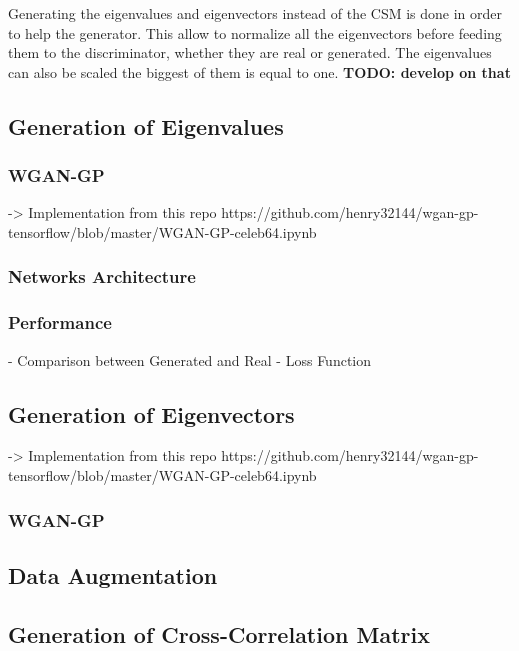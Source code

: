 \documentclass{article}
\begin{document}
Generating the eigenvalues and eigenvectors instead of the CSM is done in order to help the generator. This allow to normalize all the eigenvectors before feeding them to the discriminator, whether they are real or generated. The eigenvalues can also be scaled the biggest of them is equal to one. \textbf{TODO: develop on that} 
 

\subsection{Generation of Eigenvalues}

\subsubsection{WGAN-GP}

-> Implementation from this repo https://github.com/henry32144/wgan-gp-tensorflow/blob/master/WGAN-GP-celeb64.ipynb

\subsubsection{Networks Architecture}

\subsubsection{Performance}

- Comparison between Generated and Real
- Loss Function 

\subsection{Generation of Eigenvectors}

-> Implementation from this repo https://github.com/henry32144/wgan-gp-tensorflow/blob/master/WGAN-GP-celeb64.ipynb

\subsubsection{WGAN-GP}

\subsection{Data Augmentation}

\subsection{Generation of Cross-Correlation Matrix}

%

 
\end{document}
